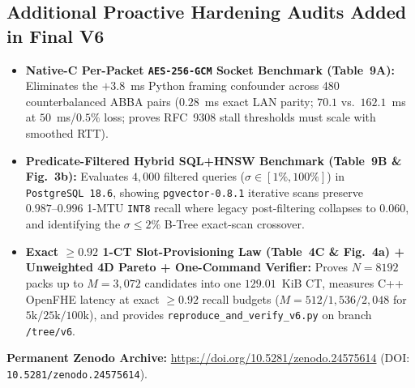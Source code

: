 \documentclass[10pt]{article}
\begin{document}
\subsection*{Additional Proactive Hardening Audits Added in Final V6}
\begin{itemize}
  \item \textbf{Native-C Per-Packet \texttt{AES-256-GCM} Socket Benchmark (Table~9A):} Eliminates the $+3.8$~ms Python framing confounder across 480 counterbalanced ABBA pairs ($0.28$~ms exact LAN parity; $70.1$ vs.\ $162.1$~ms at $50$~ms/$0.5\%$ loss; proves RFC~9308 stall thresholds must scale with smoothed RTT).
  \item \textbf{Predicate-Filtered Hybrid SQL+HNSW Benchmark (Table~9B \& Fig.~3b):} Evaluates $4{,}000$ filtered queries ($\sigma \in [1\%,100\%]$) in \texttt{PostgreSQL~18.6}, showing \nolinkurl{pgvector-0.8.1} iterative scans preserve $0.987\text{--}0.996$ 1-MTU \texttt{INT8} recall where legacy post-filtering collapses to $0.060$, and identifying the $\sigma \le 2\%$ B-Tree exact-scan crossover.
  \item \textbf{Exact $\ge 0.92$ 1-CT Slot-Provisioning Law (Table~4C \& Fig.~4a) + Unweighted 4D Pareto + One-Command Verifier:} Proves $N=8192$ packs up to $M=3{,}072$ candidates into one $129.01$~KiB CT, measures C++ OpenFHE latency at exact $\ge 0.92$ recall budgets ($M=512/1{,}536/2{,}048$ for $5\text{k}/25\text{k}/100\text{k}$), and provides \nolinkurl{reproduce_and_verify_v6.py} on branch \texttt{/tree/v6}.
\end{itemize}


\smallskip\noindent\textbf{Permanent Zenodo Archive:} \url{https://doi.org/10.5281/zenodo.24575614} (DOI: \texttt{10.5281/zenodo.24575614}).\smallskip
\end{document}
